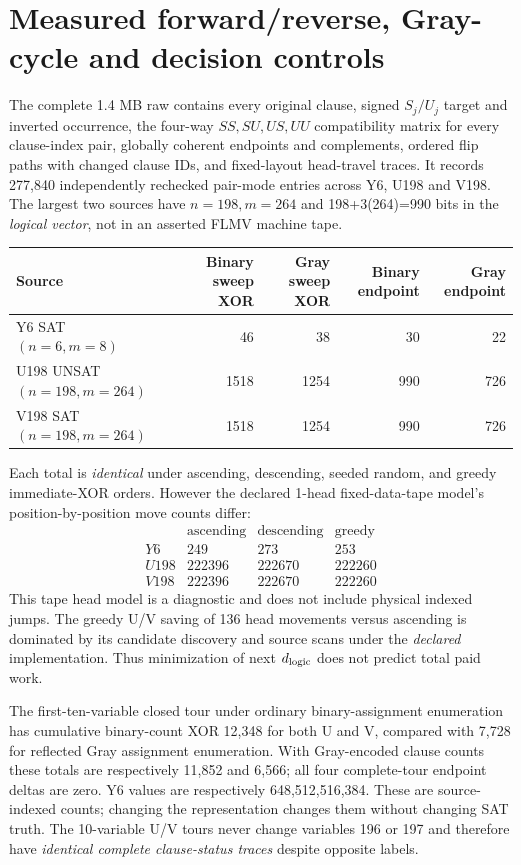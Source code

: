 \documentclass[11pt]{article}
\begin{document}
\section{Measured forward/reverse, Gray-cycle and decision controls}
The complete 1.4 MB raw contains every original clause, signed $S_j/U_j$ target and inverted occurrence, the four-way $SS,SU,US,UU$ compatibility matrix for every clause-index pair, globally coherent endpoints and complements, ordered flip paths with changed clause IDs, and fixed-layout head-travel traces. It records 277,840 independently rechecked pair-mode entries across Y6, U198 and V198. The largest two sources have $n=198,m=264$ and 198+3(264)=990 bits in the \emph{logical vector}, not in an asserted FLMV machine tape.

\begin{center}\begin{tabular}{lrrrr}
\toprule
Source & Binary sweep XOR & Gray sweep XOR & Binary endpoint & Gray endpoint\\\midrule
Y6 SAT $(n=6,m=8)$ & 46 & 38 & 30 & 22\\
U198 UNSAT $(n=198,m=264)$ & 1518 & 1254 & 990 & 726\\
V198 SAT $(n=198,m=264)$ & 1518 & 1254 & 990 & 726\\\bottomrule
\end{tabular}\end{center}
Each total is \emph{identical} under ascending, descending, seeded random, and greedy immediate-XOR orders. However the declared 1-head fixed-data-tape model's position-by-position move counts differ:
\[
\begin{array}{c|rrr}
&\text{ascending}&\text{descending}&\text{greedy}\\\hline
Y6&249&273&253\\
U198&222396&222670&222260\\
V198&222396&222670&222260
\end{array}
\]
This tape head model is a diagnostic and does not include physical indexed jumps. The greedy U/V saving of 136 head movements versus ascending is dominated by its candidate discovery and source scans under the \emph{declared} implementation. Thus minimization of next $d_{\rm logic}$ does not predict total paid work.

The first-ten-variable closed tour under ordinary binary-assignment enumeration has cumulative binary-count XOR 12,348 for both U and V, compared with 7,728 for reflected Gray assignment enumeration. With Gray-encoded clause counts these totals are respectively 11,852 and 6,566; all four complete-tour endpoint deltas are zero. Y6 values are respectively 648,512,516,384. These are source-indexed counts; changing the representation changes them without changing SAT truth. The 10-variable U/V tours never change variables 196 or 197 and therefore have \emph{identical complete clause-status traces} despite opposite labels.
\end{document}
